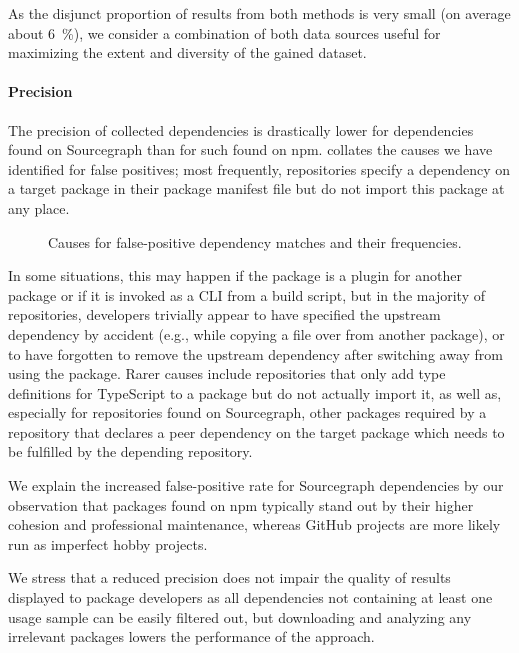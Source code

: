 As the disjunct proportion of results from both methods is very small (on average about \SI{6}{\percent}), we consider a combination of both data sources useful for maximizing the extent and diversity of the gained dataset.

\paragraph{Precision}
\label{sec:evaluation/resqu1/precision}

The precision of collected dependencies is drastically lower for dependencies found on Sourcegraph than for such found on npm.
 collates the causes we have identified for false positives; most frequently, repositories specify a dependency on a target package in their package manifest file but do not import this package at any place.

\begin{figure}
	\centering
	\small
	\renewcommand\theadfont{\small}
	

	\caption{Causes for false-positive dependency matches and their frequencies.}
	\label{fig:evaluation/resqu1/fp_causes}
\end{figure}

In some situations, this may happen if the package is a plugin for another package or if it is invoked as a CLI from a build script, but in the majority of repositories, developers trivially appear to have specified the upstream dependency by accident (e.g., while copying a  file over from another package), or to have forgotten to remove the upstream dependency after switching away from using the package.
Rarer causes include repositories that only add type definitions for TypeScript to a package but do not actually import it, as well as, especially for repositories found on Sourcegraph, other packages required by a repository that declares a peer dependency on the target package which needs to be fulfilled by the depending repository.

We explain the increased false-positive rate for Sourcegraph dependencies by our observation that packages found on npm typically stand out by their higher cohesion and professional maintenance, whereas GitHub projects are more likely run as imperfect hobby projects.

We stress that a reduced precision does not impair the quality of results displayed to package developers as all dependencies not containing at least one
usage sample can be easily filtered out, but downloading and analyzing any irrelevant packages lowers the performance of the approach.

